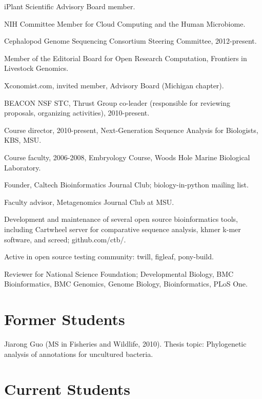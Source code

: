 \documentclass[margin,line]{resume}
\begin{document}
\begin{resume}
\begin{list1}
\item[] iPlant Scientific Advisory Board member.
\item[] NIH Committee Member for Cloud Computing and the Human Microbiome.
\item[] Cephalopod Genome Sequencing Consortium Steering Committee, 2012-present.
\item[] Member of the Editorial Board for Open Research Computation,
Frontiers in Livestock Genomics.
\item[] Xconomist.com, invited member, Advisory Board (Michigan chapter).
\item[] BEACON NSF STC, Thrust Group co-leader (responsible for reviewing
proposals, organizing activities), 2010-present.
\item[] Course director, 2010-present, Next-Generation Sequence Analysis for Biologists, KBS, MSU.
\item[] Course faculty, 2006-2008, Embryology Course, Woods Hole Marine Biological Laboratory.
\item[] Founder, Caltech Bioinformatics Journal Club; biology-in-python
mailing list.
\item[] Faculty advisor, Metagenomics Journal Club at MSU.
\item[] Development and maintenance of several open source bioinformatics tools, including
Cartwheel server for comparative sequence analysis, khmer k-mer software,
and screed; github.com/ctb/.
\item[] Active in open source testing community: twill, figleaf, pony-build.
\item[] Reviewer for National Science Foundation; Developmental Biology, BMC Bioinformatics, BMC Genomics, Genome Biology, Bioinformatics, PLoS One.
\end{list1}

\section{\mysidestyle Former Students}

Jiarong Guo (MS in Fisheries and Wildlife, 2010).  Thesis topic:
Phylogenetic analysis of annotations for uncultured bacteria.

\section{\mysidestyle Current Students}


\end{resume}
\end{document}
